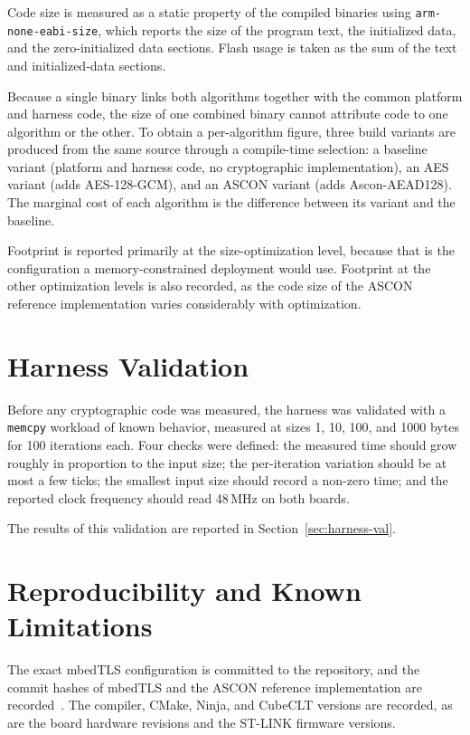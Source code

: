 Code size is measured as a static property of the compiled binaries using
\texttt{arm-none-eabi-size}, which reports the size of the program text, the
initialized data, and the zero-initialized data sections.
Flash usage is taken as the sum of the text and initialized-data sections.

Because a single binary links both algorithms together with the common platform
and harness code, the size of one combined binary cannot attribute code to one
algorithm or the other.
To obtain a per-algorithm figure, three build variants are produced from the
same source through a compile-time selection:
a baseline variant (platform and harness code, no cryptographic implementation),
an AES variant (adds AES-128-GCM), and an ASCON variant (adds Ascon-AEAD128).
The marginal cost of each algorithm is the difference between its variant and
the baseline.

Footprint is reported primarily at the size-optimization level, because that
is the configuration a memory-constrained deployment would use.
Footprint at the other optimization levels is also recorded, as the code size of
the ASCON reference implementation varies considerably with optimization.

\section{Harness Validation}

Before any cryptographic code was measured, the harness was validated with a
\texttt{memcpy} workload of known behavior, measured at sizes 1, 10, 100, and
1000 bytes for 100 iterations each.
Four checks were defined: the measured time should grow roughly in proportion to
the input size; the per-iteration variation should be at most a few ticks; the
smallest input size should record a non-zero time; and the reported clock
frequency should read 48\,MHz on both boards.

The results of this validation are reported in Section~\ref{sec:harness-val}.

\section{Reproducibility and Known Limitations}

The exact mbedTLS configuration is committed to the repository, and the commit
hashes of mbedTLS and the ASCON reference implementation are
recorded~\cite{mbedTLS,ASCONSoftware}.
The compiler, CMake, Ninja, and CubeCLT versions are recorded, as are the
board hardware revisions and the ST-LINK firmware versions.

